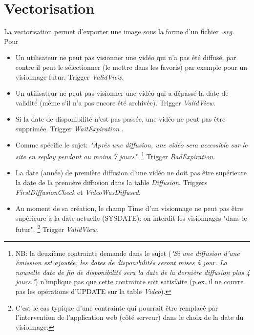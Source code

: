 \documentclass[twoside,openright,a4paper,11pt,french]{article}
\begin{document}
\newpage

\section{Vectorisation} 
La vectorisation permet d'exporter une image sous la forme d'un
fichier {\it .svg}. Pour 


\begin{itemize}
\item Un utilisateur ne peut pas visionner une vidéo qui n'a pas été diffusé,
par contre il peut le sélectionner (le mettre dans les favoris) par exemple
pour un visionnage futur. Trigger {\it ValidView}.

\item Un utilisateur ne peut pas visionner une vidéo qui a dépassé la date de
validité (même s'il n'a pas encore été archivée). Trigger {\it ValidView}.

\item Si la date de disponibilité n'est pas passée, une vidéo ne peut pas être supprimée. 
      Trigger {\it WaitExpiration }.

\item Comme spécifie le sujet: {\it "Après une diffusion, une vidéo sera
accessible sur le site en replay pendant au moins 7 jours"}. 
\footnote{NB: la deuxième contrainte demande dans le sujet ({\it"Si une diffusion d’une émission est
ajoutée, les dates de disponibilités seront mises à jour.  La nouvelle date de
fin de disponibilité sera la date de la dernière diffusion plus 4 jours."})
n'implique pas que cette contrainte soit satisfaite (p.ex. il ne couvre pas les
opérations d'UPDATE sur la table {\it Video}).} 
Trigger {\it BadExpiration}.

\item La date (année) de première diffusion d'une vidéo ne doit pas être
supérieure la date de la première diffusion dans la table {\it Diffusion}.
Triggers {\it FirstDiffusionCheck} et {\it VideoWasDiffused}.

\item  Au moment de sa création, le champ Time d'un visionnage ne peut pas être
supérieure à la date actuelle (SYSDATE): on interdit les visionnages "dans le
futur".
\footnote{C'est le cas typique d'une contrainte qui pourrait être remplacé par
l'intervention de l'application web (côté serveur) dans le choix de la date du
visionnage.}
Trigger {\it ValidView}.



\end{itemize}

\end{document}
